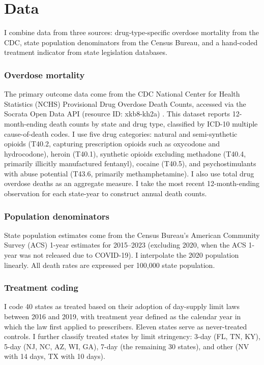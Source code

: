\documentclass[12pt]{article}
\begin{document}
\section{Data}

I combine data from three sources: drug-type-specific overdose mortality from the CDC, state population denominators from the Census Bureau, and a hand-coded treatment indicator from state legislation databases.

\subsubsection*{Overdose mortality} The primary outcome data come from the CDC National Center for Health Statistics (NCHS) Provisional Drug Overdose Death Counts, accessed via the Socrata Open Data API (resource ID: xkb8-kh2a) \citep{cdc2024overdose}. This dataset reports 12-month-ending death counts by state and drug type, classified by ICD-10 multiple cause-of-death codes. I use five drug categories: natural and semi-synthetic opioids (T40.2, capturing prescription opioids such as oxycodone and hydrocodone), heroin (T40.1), synthetic opioids excluding methadone (T40.4, primarily illicitly manufactured fentanyl), cocaine (T40.5), and psychostimulants with abuse potential (T43.6, primarily methamphetamine). I also use total drug overdose deaths as an aggregate measure. I take the most recent 12-month-ending observation for each state-year to construct annual death counts.

\subsubsection*{Population denominators} State population estimates come from the Census Bureau's American Community Survey (ACS) 1-year estimates for 2015--2023 (excluding 2020, when the ACS 1-year was not released due to COVID-19). I interpolate the 2020 population linearly. All death rates are expressed per 100,000 state population.

\subsubsection*{Treatment coding} I code 40 states as treated based on their adoption of day-supply limit laws between 2016 and 2019, with treatment year defined as the calendar year in which the law first applied to prescribers. Eleven states serve as never-treated controls. I further classify treated states by limit stringency: 3-day (FL, TN, KY), 5-day (NJ, NC, AZ, WI, GA), 7-day (the remaining 30 states), and other (NV with 14 days, TX with 10 days).
\end{document}
